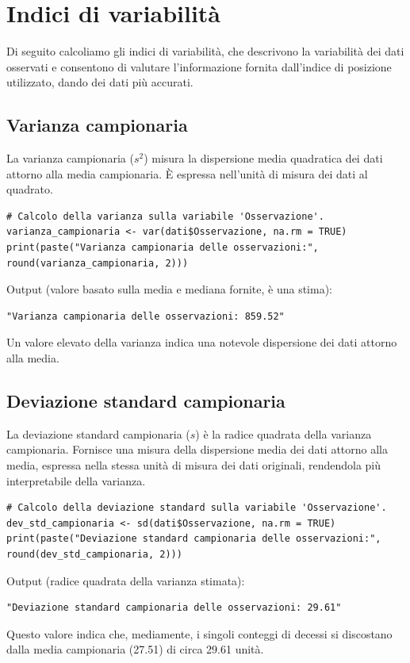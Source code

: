 \documentclass[14pt, openany, titlepage]{report} %
\begin{document}
\chapter{Indici di variabilità} 
Di seguito calcoliamo gli indici di variabilità, che descrivono la 
variabilità dei dati osservati e consentono di valutare l'informazione 
fornita dall'indice di posizione utilizzato, dando dei dati più accurati.

\section{Varianza campionaria}
La varianza campionaria ($s^2$) misura la dispersione
 media quadratica dei dati attorno alla media campionaria.
  È espressa nell'unità di misura dei dati al quadrato.
\begin{center}
\begin{lstlisting}[breaklines=true]
# Calcolo della varianza sulla variabile 'Osservazione'.
varianza_campionaria <- var(dati$Osservazione, na.rm = TRUE)
print(paste("Varianza campionaria delle osservazioni:", round(varianza_campionaria, 2)))
\end{lstlisting}
\end{center}
\noindent
Output (valore basato sulla media e mediana fornite, è una stima):
\begin{verbatim}
"Varianza campionaria delle osservazioni: 859.52" 
\end{verbatim}
Un valore elevato della varianza indica una notevole
 dispersione dei dati attorno alla media.
    
\section{Deviazione standard campionaria}
La deviazione standard campionaria ($s$) è la radice quadrata 
della varianza campionaria. Fornisce una misura della dispersione
 media dei dati attorno alla media, espressa nella stessa unità 
 di misura dei dati originali, rendendola più interpretabile 
 della varianza.
\begin{center}
\begin{lstlisting}[breaklines=true]
# Calcolo della deviazione standard sulla variabile 'Osservazione'.
dev_std_campionaria <- sd(dati$Osservazione, na.rm = TRUE)
print(paste("Deviazione standard campionaria delle osservazioni:", round(dev_std_campionaria, 2)))
\end{lstlisting}
\end{center}
\noindent
Output (radice quadrata della varianza stimata):
\begin{verbatim}
"Deviazione standard campionaria delle osservazioni: 29.61"
\end{verbatim}
Questo valore indica che, mediamente, i singoli conteggi di 
decessi si discostano dalla media campionaria (27.51) di 
circa 29.61 unità.
    
\end{document}
